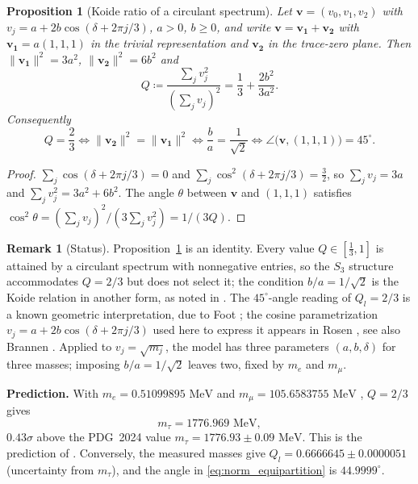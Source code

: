 \documentclass[11pt,reqno]{amsart}
\newtheorem{proposition}[theorem]{Proposition}
\theoremstyle{definition}
\newtheorem{remark}[theorem]{Remark}
\begin{document}
\begin{proposition}[Koide ratio of a circulant spectrum]\label{thm:koide_exact}
Let $\mathbf{v} = (v_0, v_1, v_2)$ with $v_j = a + 2b\cos(\delta + 2\pi j/3)$, $a > 0$, $b \ge 0$, and write $\mathbf{v} = \mathbf{v}_{\mathbf{1}} + \mathbf{v}_{\mathbf{2}}$ with $\mathbf{v}_{\mathbf{1}} = a(1,1,1)$ in the trivial representation and $\mathbf{v}_{\mathbf{2}}$ in the trace-zero plane. Then $\|\mathbf{v}_{\mathbf{1}}\|^2 = 3a^2$, $\|\mathbf{v}_{\mathbf{2}}\|^2 = 6b^2$ and
\begin{equation}\label{eq:koide_general}
    Q \coloneqq \frac{\sum_j v_j^2}{\left(\sum_j v_j\right)^2} = \frac13 + \frac{2b^2}{3a^2}.
\end{equation}
Consequently
\begin{equation}\label{eq:norm_equipartition}
    Q = \frac23 \iff \|\mathbf{v}_{\mathbf{2}}\|^2 = \|\mathbf{v}_{\mathbf{1}}\|^2 \iff \frac{b}{a} = \frac{1}{\sqrt2} \iff \angle\big(\mathbf{v}, (1,1,1)\big) = 45^\circ.
\end{equation}
\end{proposition}

\begin{proof}
$\sum_j \cos(\delta + 2\pi j/3) = 0$ and $\sum_j \cos^2(\delta + 2\pi j/3) = \frac32$, so $\sum_j v_j = 3a$ and $\sum_j v_j^2 = 3a^2 + 6b^2$. The angle $\theta$ between $\mathbf{v}$ and $(1,1,1)$ satisfies $\cos^2\theta = (\sum_j v_j)^2/(3\sum_j v_j^2) = 1/(3Q)$.
\end{proof}

\begin{remark}[Status]
Proposition~\ref{thm:koide_exact} is an identity. Every value $Q \in [\frac13, 1]$ is attained by a circulant spectrum with nonnegative entries, so the $S_3$ structure accommodates $Q = 2/3$ but does not select it; the condition $b/a = 1/\sqrt2$ is the Koide relation \cite{koide1982,koide1983fermion} in another form, as noted in \cite[Ch.~12, Sec.~7]{silvafilho2026book}. The $45^\circ$-angle reading of $Q_l = 2/3$ is a known geometric interpretation, due to Foot \cite{foot1994note}; the cosine parametrization $v_j = a + 2b\cos(\delta + 2\pi j/3)$ used here to express it appears in Rosen \cite{rosen2007heuristic}, see also Brannen \cite{brannen2010spin}. Applied to $v_j = \sqrt{m_j}$, the model has three parameters $(a, b, \delta)$ for three masses; imposing $b/a = 1/\sqrt2$ leaves two, fixed by $m_e$ and $m_\mu$.
\end{remark}

\textbf{Prediction.} With $m_e = 0.51099895\text{ MeV}$ and $m_\mu = 105.6583755\text{ MeV}$ \cite{pdg2024}, $Q = 2/3$ gives
\begin{equation}
    m_\tau = 1776.969\text{ MeV},
\end{equation}
$0.43\sigma$ above the PDG~2024 value $m_\tau = 1776.93 \pm 0.09\text{ MeV}$. This is the prediction of \cite{koide1982,koide1983fermion}. Conversely, the measured masses give $Q_l = 0.6666645 \pm 0.0000051$ (uncertainty from $m_\tau$), and the angle in \eqref{eq:norm_equipartition} is $44.9999^\circ$.
\end{document}
